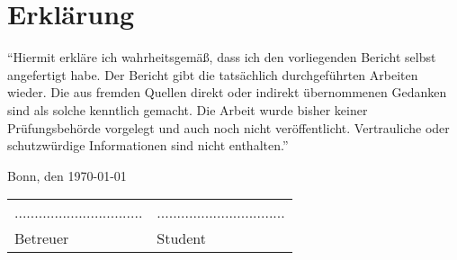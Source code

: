 \section*{Erklärung}
``Hiermit erkläre ich wahrheitsgemäß, dass ich den vorliegenden Bericht selbst angefertigt habe. Der Bericht gibt die tatsächlich durchgeführten Arbeiten wieder. Die aus fremden Quellen direkt oder indirekt übernommenen Gedanken sind als solche kenntlich gemacht. Die Arbeit wurde bisher keiner Prüfungsbehörde vorgelegt und auch noch nicht veröffent­licht. Vertrauliche oder schutzwürdige Informationen sind nicht enthalten.'' \newline
\newline

Bonn, den \today
\newline
\newline


\begin{tabular}{ll}

    ................................ & ................................ \\
    Betreuer                      & Student
\end{tabular}
